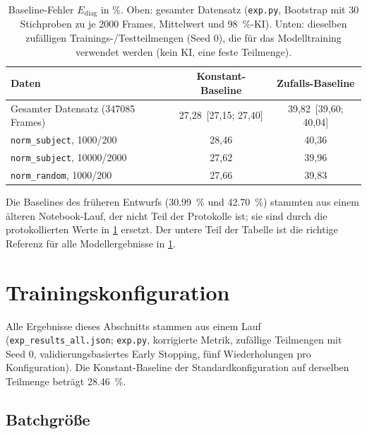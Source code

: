 \documentclass[
  11pt,
  a4paper,
  oneside,
  DIV=12,
  BCOR=8mm,
  parskip=half,
  headings=normal,
  bibliography=totoc,
  listof=totoc
]{scrreprt}
\newcommand{\code}[1]{\texttt{#1}}
\newcommand{\Ediag}{E_{\mathrm{diag}}}
\begin{document}
\begin{table}[htbp]
  \centering
  \caption{Baseline-Fehler $\Ediag$ in \si{\percent}. Oben: gesamter
           Datensatz (\code{exp.py}, Bootstrap mit 30 Stichproben zu je
           2000 Frames, Mittelwert und \SI{98}{\percent}-KI). Unten: dieselben
           zufälligen Trainings-/Testteilmengen (Seed 0), die für das
           Modelltraining verwendet werden (kein KI, eine feste Teilmenge).}
  \label{tab:baselines}
  \small
  \begin{tabular}{lcc}
    \toprule
    Daten & Konstant-Baseline & Zufalls-Baseline \\
    \midrule
    Gesamter Datensatz (\num{347085} Frames) & 27,28 \,[27,15; 27,40] & 39,82 \,[39,60; 40,04] \\
    \midrule
    \code{norm\_subject}, \num{1000}/\num{200}   & 28,46 & 40,36 \\
    \code{norm\_subject}, \num{10000}/\num{2000} & 27,62 & 39,96 \\
    \code{norm\_random}, \num{1000}/\num{200}    & 27,66 & 39,83 \\
    \bottomrule
  \end{tabular}
\end{table}

Die Baselines des früheren Entwurfs (\SI{30,99}{\percent} und
\SI{42,70}{\percent}) stammten aus einem älteren Notebook-Lauf, der nicht
Teil der Protokolle ist; sie sind durch die protokollierten Werte in
\cref{tab:baselines} ersetzt. Der untere Teil der Tabelle ist die richtige
Referenz für alle Modellergebnisse in \cref{sec:training}.

\section{Trainingskonfiguration}
\label{sec:training}

Alle Ergebnisse dieses Abschnitts stammen aus einem Lauf
(\code{exp\_results\_all.json}; \code{exp.py}, korrigierte Metrik, zufällige
Teilmengen mit Seed 0, validierungsbasiertes Early Stopping, fünf
Wiederholungen pro Konfiguration). Die Konstant-Baseline der
Standardkonfiguration auf derselben Teilmenge beträgt \SI{28,46}{\percent}.

\subsection{Batchgröße}
\label{sec:batch}
\end{document}
